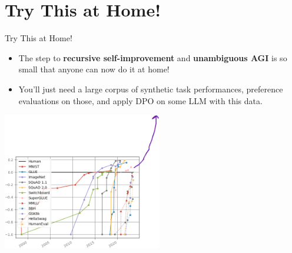 \documentclass{beamer}
\begin{document}
\section{Try This at Home!}
\begin{frame}{Try This at Home!}
  \begin{itemize}
   \item The step to \textbf{recursive self-improvement} and \textbf{unambiguous AGI} is so small that anyone can now do it at home!
   \item You'll just need a large corpus of synthetic task performances, preference evaluations on those, and apply DPO on some LLM with this data.
  \end{itemize}
  \hspace{2cm}\includegraphics[height=6cm]{recursive.png}
\end{frame}
\end{document}
